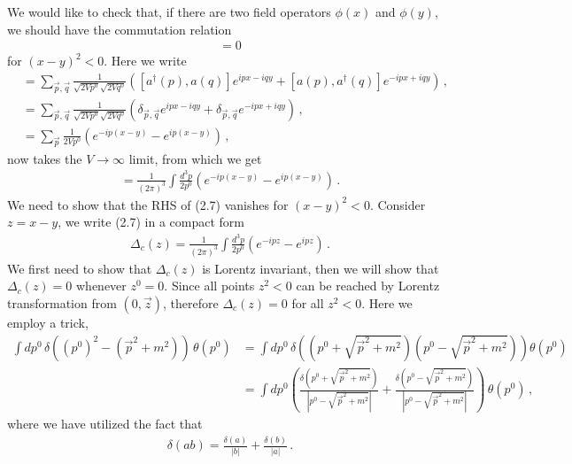 \documentclass[11pt, onesided]{book}
\theoremstyle{break}
\theoremstyle{break}
\begin{document}
We would like to check that, if there are two field operators $\phi(x)$ and $\phi(y)$, we should have the commutation relation
\begin{align*}
[\phi(x), \phi(y)] = 0
\end{align*}
for $(x-y)^2 < 0$.
Here we write
\begin{align*}
[\phi(x),\phi(y)] 
&= \sum_{\vec{p},\vec{q}} \frac{1}{\sqrt{2Vp^0}\sqrt{2Vq^0}}\left( [a^\dagger(p), a(q)] e^{ipx - iqy} + [a(p) , a^\dagger(q)]e^{-ipx + iqy}\right)\,,\\
&= \sum_{\vec{p},\vec{q}} \frac{1}{\sqrt{2Vp^0}\sqrt{2Vq^0}}\left( \delta_{\vec{p}, \vec{q}} e^{ipx - iqy} + \delta_{\vec{p}, \vec{q}} e^{-ipx + iqy}\right)\,,\\
&= \sum_{\vec{p}} \frac{1}{2Vp^0}\left( e^{-ip(x-y)} - e^{ip(x-y)}\right)\,,
\end{align*}
now takes the $V \to \infty$ limit, from which we get
\begin{align}
[\phi(x), \phi(y)] = \frac{1}{(2\pi)^3}\int \frac{d^3p}{2p^0} \left( e^{-ip(x-y)} - e^{ip(x-y)}\right)\,.
\end{align}
We need to show that the RHS of (2.7) vanishes for $(x-y)^2 <0$. Consider $z = x-y$, we write (2.7) in a compact form
\begin{align*}
\Delta_c(z) = \frac{1}{(2\pi)^3} \int \frac{d^3p}{2p^0}\left( e^{-ipz} - e^{ipz}\right)\,.
\end{align*}
We first need to show that $\Delta_c(z)$ is Lorentz invariant, then we will show that $\Delta_c(z) = 0$ whenever $z^0 = 0$. Since all points $z^2 < 0$ can be reached by Lorentz transformation from $(0,\vec{z})$, therefore $\Delta_c(z) =0$ for all $z^2 <0$. Here we employ a trick,
\begin{align*}
\int dp^0 \, \delta((p^0)^2 - (\vec{p}^2 + m^2)) \,\theta(p^0)&= \int dp^0\, \delta\left( (p^0 + \sqrt{\vec{p}^2 + m^2})(p^0 -\sqrt{\vec{p}^2 + m^2})\right) \theta(p^0)\\
&= \int dp^0 \left(\frac{\delta(p^0 + \sqrt{\vec{p}^2 + m^2})}{|p^0 - \sqrt{\vec{p}^2 + m^2}|} +  \frac{\delta(p^0 -\sqrt{\vec{p}^2 + m^2})}{|p^0 - \sqrt{\vec{p}^2 + m^2}|}  \right)\, \theta(p^0)\,,
\end{align*}
where we have utilized the fact that
\begin{align*}
\delta(ab) = \frac{\delta(a)}{|b|} + \frac{\delta(b)}{|a|}\,.
\end{align*}
\end{document}

